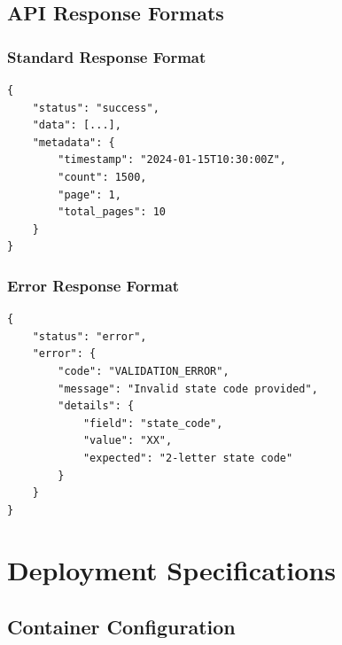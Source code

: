 \subsection{API Response Formats}

\subsubsection{Standard Response Format}
\begin{verbatim}
{
    "status": "success",
    "data": [...],
    "metadata": {
        "timestamp": "2024-01-15T10:30:00Z",
        "count": 1500,
        "page": 1,
        "total_pages": 10
    }
}
\end{verbatim}

\subsubsection{Error Response Format}
\begin{verbatim}
{
    "status": "error",
    "error": {
        "code": "VALIDATION_ERROR",
        "message": "Invalid state code provided",
        "details": {
            "field": "state_code",
            "value": "XX",
            "expected": "2-letter state code"
        }
    }
}
\end{verbatim}


\section{Deployment Specifications}

\subsection{Container Configuration}

